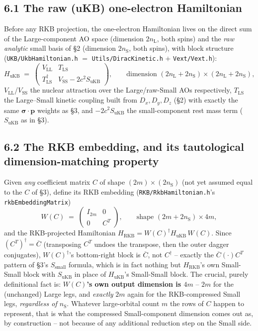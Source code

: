 \documentclass[11pt]{article}
\newcommand{\bs}[1]{\boldsymbol{#1}}
\begin{document}
\subsection*{6.1 The raw (uKB) one-electron Hamiltonian}

Before any RKB projection, the one-electron Hamiltonian lives on the direct sum of the
Large-component AO space (dimension $2n_{\text{L}}$, both spins) and the \emph{raw analytic} small
basis of \S2 (dimension $2n_{\text{S}}$, both spins), with block structure
(\texttt{UKB/UkbHamiltonian.h} $=$ \texttt{Utils/DiracKinetic.h} $+$ \texttt{Vext/Vext.h}):
\begin{equation}
H_{\text{uKB}} \;=\;
\begin{pmatrix} V_{\text{LL}} & T_{\text{LS}} \\ T_{\text{LS}}^{\dagger} & V_{\text{SS}}-2c^2 S_{\text{uKB}} \end{pmatrix},
\qquad\text{dimension } (2n_{\text{L}}+2n_{\text{S}})\times(2n_{\text{L}}+2n_{\text{S}}),
\end{equation}
$V_{\text{LL}}$/$V_{\text{SS}}$ the nuclear attraction over the Large/raw-Small AOs respectively,
$T_{\text{LS}}$ the Large--Small kinetic coupling built from $D_x,D_y,D_z$ (\S2) with exactly the
same $\bs\sigma\!\cdot\!\bs p$ weights as \S3, and $-2c^2S_{\text{uKB}}$ the small-component rest
mass term ($S_{\text{uKB}}$ as in \S3).

\subsection*{6.2 The RKB embedding, and its tautological dimension-matching property}

Given \emph{any} coefficient matrix $C$ of shape $(2m)\times(2n_{\text{S}})$ (not yet assumed equal
to the $C$ of \S3), define its RKB embedding (\texttt{RKB/RkbHamiltonian.h}'s
\texttt{rkbEmbeddingMatrix})
\begin{equation}
W(C) \;=\; \begin{pmatrix} I_{2m} & 0 \\ 0 & C^{T} \end{pmatrix},
\qquad\text{shape } (2m+2n_{\text{S}})\times 4m,
\end{equation}
and the RKB-projected Hamiltonian $H_{\text{RKB}} = W(C)^{\dagger}H_{\text{uKB}}\,W(C)$. Since
$(C^{T})^{\dagger}=\overline{C}$ (transposing $C^T$ undoes the transpose, then the outer dagger
conjugates), $W(C)^{\dagger}$'s bottom-right block is $\overline{C}$, not $C^{\dagger}$ -- exactly
the $\overline{C}(\cdot)C^{T}$ pattern of \S3's $S_{\text{small}}$ formula, which is in fact nothing
but $H_{\text{RKB}}$'s own Small-Small block with $S_{\text{uKB}}$ in place of $H_{\text{uKB}}$'s
Small-Small block. The crucial, purely definitional fact is: \textbf{$W(C)$'s own output dimension
is $4m$} -- $2m$ for the (unchanged) Large legs, and \emph{exactly} $2m$ again for the
RKB-compressed Small legs, \emph{regardless of $n_{\text{S}}$}. Whatever large-orbital count $m$
the rows of $C$ happen to represent, that is what the compressed Small-component dimension comes
out as, by construction -- not because of any additional reduction step on the Small side.
\end{document}
